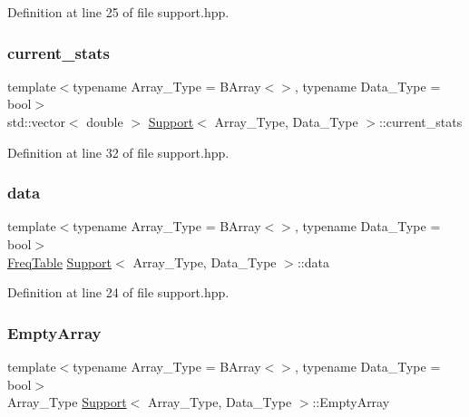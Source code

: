 Definition at line 25 of file support.\+hpp.

\mbox{\label{class_support_ada67557033378742f8592a96f39d1127}} 
\subsubsection{\texorpdfstring{current\+\_\+stats}{current\_stats}}
{\footnotesize\ttfamily template$<$typename Array\+\_\+\+Type = B\+Array$<$$>$, typename Data\+\_\+\+Type = bool$>$ \\
std\+::vector$<$ double $>$ \hyperlink{class_support}{Support}$<$ Array\+\_\+\+Type, Data\+\_\+\+Type $>$\+::current\+\_\+stats}



Definition at line 32 of file support.\+hpp.

\mbox{\label{class_support_ad399b4c1f9619c4e90dea0ffcf3c85c1}} 
\subsubsection{\texorpdfstring{data}{data}}
{\footnotesize\ttfamily template$<$typename Array\+\_\+\+Type = B\+Array$<$$>$, typename Data\+\_\+\+Type = bool$>$ \\
\hyperlink{class_freq_table}{Freq\+Table} \hyperlink{class_support}{Support}$<$ Array\+\_\+\+Type, Data\+\_\+\+Type $>$\+::data}



Definition at line 24 of file support.\+hpp.

\mbox{\label{class_support_a9364028f9966697e3cdd3fc6a5cd90de}} 
\subsubsection{\texorpdfstring{Empty\+Array}{EmptyArray}}
{\footnotesize\ttfamily template$<$typename Array\+\_\+\+Type = B\+Array$<$$>$, typename Data\+\_\+\+Type = bool$>$ \\
Array\+\_\+\+Type \hyperlink{class_support}{Support}$<$ Array\+\_\+\+Type, Data\+\_\+\+Type $>$\+::Empty\+Array}



